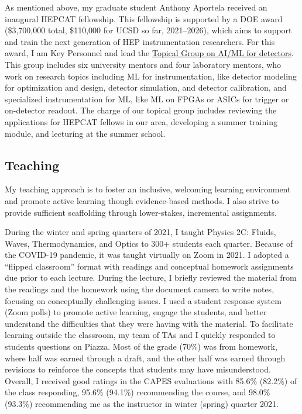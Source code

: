\documentclass[11pt,letterpaper,notitlepage]{article}
\begin{document}
As mentioned above, my graduate student Anthony Aportela received an inaugural HEPCAT fellowship.
This fellowship is supported by a DOE award (\$3,700,000 total, \$110,000 for UCSD so far, 2021--2026), which aims to support and train the next generation of HEP instrumentation researchers.
For this award, I am Key Personnel and lead the \href{https://hepcat.ucsd.edu/topical-groups/tg7-ai-ml-for-detectors-2/}{Topical Group on AI/ML for detectors}.
This group includes six university mentors and four laboratory mentors, who work on research topics including ML for instrumentation, like detector modeling for optimization and design, detector simulation, and detector calibration, and specialized instrumentation for ML, like ML on FPGAs or ASICs for trigger or on-detector readout.
The charge of our topical group includes reviewing the applications for HEPCAT fellows in our area, developing a summer training module, and lecturing at the summer school.

\vspace{-1ex}
\subsection*{Teaching}

My teaching approach is to foster an inclusive, welcoming learning environment and promote active learning though evidence-based methods.
I also strive to provide sufficient scaffolding through lower-stakes, incremental assignments.

During the winter and spring quarters of 2021, I taught Physics 2C: Fluids, Waves, Thermodynamics, and Optics to 300+ students each quarter.
Because of the COVID-19 pandemic, it was taught virtually on Zoom in 2021.
I adopted a ``flipped classroom'' format with readings and conceptual homework assignments due prior to each lecture.
During the lecture, I briefly reviewed the material from the readings and the homework using the document camera to write notes, focusing on conceptually challenging issues.
I used a student response system (Zoom polls) to promote active learning, engage the students, and better understand the difficulties that they were having with the material.
To facilitate learning outside the classroom, my team of TAs and I quickly responded to students questions on Piazza.
Most of the grade (70\%) was from homework, where half was earned through a draft, and the other half was earned through revisions to reinforce the concepts that students may have misunderstood.
Overall, I received good ratings in the CAPES evaluations with 85.6\% (82.2\%) of the class responding, 95.6\% (94.1\%) recommending the course, and 98.0\% (93.3\%) recommending me as the instructor in winter (spring) quarter 2021.
\end{document}
